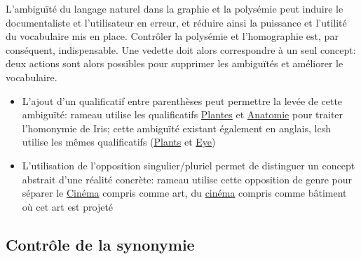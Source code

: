L'ambiguïté du langage naturel dans la graphie et la polysémie peut induire le documentaliste et l'utilisateur en erreur, et réduire ainsi la puissance et l'utilité du vocabulaire mis en place. Contrôler la polysémie et l'homographie est, par conséquent, indispensable. Une vedette doit alors correspondre à un seul concept: deux actions sont alors possibles pour supprimer les ambiguïtés et améliorer le vocabulaire.
\begin{itemize}
	\item L'ajout d'un qualificatif entre parenthèses peut permettre la levée de cette ambiguïté: \ac{rameau} utilise les qualificatifs \og \href{https://data.bnf.fr/fr/11935557/iris__plantes_/}{Plantes}\fg{} et \og\href{https://data.bnf.fr/fr/11938389/iris__anatomie_/}{Anatomie}\fg{} pour traiter l'homonymie de \og Iris\fg{}; cette ambiguïté existant également en anglais, \ac{lcsh} utilise les mêmes qualificatifs (\og \href{https://id.loc.gov/authorities/subjects/sh85068079.html}{Plants}\fg{} et \og\href{https://id.loc.gov/authorities/subjects/sh85068076.html}{Eye}\fg{})
	\item L'utilisation de l'opposition singulier/pluriel permet de distinguer un concept abstrait d'une réalité concrète: \ac{rameau} utilise cette opposition de genre pour séparer le \og \href{https://data.bnf.fr/fr/11936118/cinema/}{Cinéma}\fg{} compris comme art, du \og \href{https://data.bnf.fr/fr/11939426/cinemas/}{cinéma}\fg{} compris comme bâtiment où cet art est projeté
\end{itemize}

\subsection{\label{I-A-2-c}Contrôle de la synonymie}

